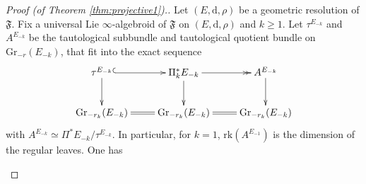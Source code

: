 \documentclass[10pt]{article}
\theoremstyle{plain}
\theoremstyle{definition}
\theoremstyle{remark}
\newcommand{\dd}{\mathrm{d}}
\begin{document}
\begin{proof}[Proof (of Theorem \ref{thm:projective1}).]Let $(E,\dd, \rho)$ be a geometric resolution of $\mathfrak F$. Fix a universal Lie $\infty$-algebroid of $\mathfrak F$ on $(E,\dd, \rho)$ and $k\geq 1$. Let $\tau^{E_{-k}}$ and $A^{E_{-k}}$ be the tautological subbundle and tautological quotient bundle on $\mathrm{Gr}_{-r}(E_{-k})$, that fit into the exact sequence\begin{equation}
     \xymatrix{&\tau^{E_{-k}}\ar@{^{(}->}[r]\ar[d]& \Pi_k^*E_{-k}\ar@{->>}[r]\ar[d]& A^{E_{-k}}\ar[d]& \\&\mathrm{Gr}_{-r_k}(E_{-k})\ar@{=}[r]&\mathrm{Gr}_{-r_k}(E_{-k})\ar@{=}[r]&\mathrm{Gr}_{-r_k}(E_{-k})&}
 \end{equation}
with  $A^{E_{-k}}\simeq \Pi^*E_{-k}/\tau^{E_{-k}}$. In particular, for $k=1$, $\mathrm{rk}(A^{E_{-1}})$ is the dimension of the regular leaves. One has
 \begin{enumerate}
 

\end{enumerate}
\end{proof}
\end{document}
